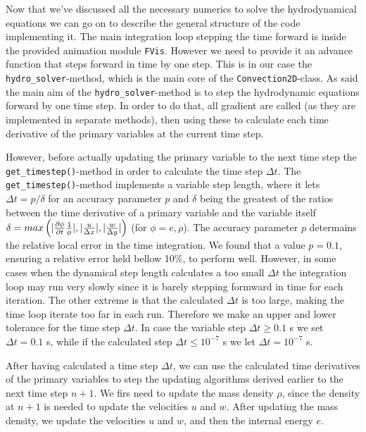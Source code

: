 \documentclass{emulateapj}
\begin{document}
	Now that we've discussed all the necessary numerics to solve the hydrodynamical equations we can go on to describe the general structure of the code implementing it. The main integration loop stepping the time forward is inside the provided animation module \texttt{FVis}. However we need to provide it an advance function that steps forward in time by one step. This is in our case the \texttt{hydro\_solver}-method, which is the main core of the \texttt{Convection2D}-class. As said the main aim of the \texttt{hydro\_solver}-method is to step the hydrodynamic equations forward by one time step. In order to do that, all gradient are called (as they are implemented in separate methods), then using these to calculate each time derivative of the primary variables at the current time step. 
	
	However, before actually updating the primary variable to the next time step the \texttt{get\_timestep()}-method in order to calculate the time step $\Delta t$. The \texttt{get\_timestep()}-method implements a variable step length, where it lets $\Delta t = p/\delta$ for an accuracy parameter $p$ and $\delta$ being the greatest of the ratios between the time derivative of a primary variable and the variable itself $\delta = max\left(|\pdv{\phi}{t}\frac{1}{\phi}|, |\frac{u}{\Delta x}|, |\frac{w}{\Delta y}|\right)$ (for $\phi = e, \rho$). The accuracy parameter $p$ determains the relative local error in the time integration. We found that a value $p = 0.1$, ensuring a relative error held bellow 10\%, to perform well. However, in some cases when the dynamical step length calculates a too small $\Delta t$ the integration loop may run very slowly since it is barely stepping formward in time for each iteration. The other extreme is that the calculated $\Delta t$ is too large, making the time loop iterate too far in each run. Therefore we make an upper and lower tolerance for the time step $\Delta t$. In case the variable step $\Delta t \geq 0.1$ s we set $\Delta t = 0.1$ s, while if the calculated step $\Delta t \leq 10^{-7}$ s we let $\Delta t = 10^{-7}$ s.
	
	After having calculated a time step $\Delta t$, we can use the calculated time derivatives of the primary variables to step the updating algorithms derived earlier to the next time step $n+1$. We firs need to update the mass density $\rho$, since the density at $n+1$ is needed to update the velocities $u$ and $w$. After updating the mass density, we update the velocities $u$ and $w$, and then the internal energy $e$.  
	
\end{document}
